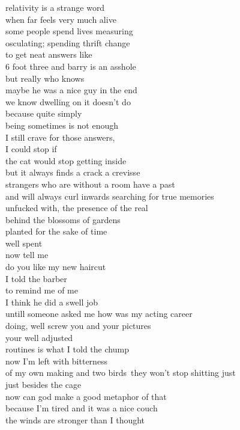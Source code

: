 relativity is a strange word\\
when far feels very much alive\\
some people spend lives measuring\\
osculating; spending thrift change\\
to get neat answers like\\
6 foot three and barry is an asshole\\
but really who knows\\
maybe he was a nice guy in the end\\
we know dwelling on it doesn't do\\

because quite simply\\
being sometimes is not enough\\
I still crave for those answers, \\
I could stop if\\
the cat would stop getting inside\\
but it always finds a crack a crevisse\\
strangers who are without a room have a past\\
and will always curl inwards searching for true memories\\
unfucked with, the presence of the real\\
behind the blossoms of gardens\\
planted for the sake of time\\
well spent\\

now tell me\\
do you like my new haircut\\
I told the barber\\
to remind me of me\\
I think he did a swell job\\
untill someone asked me how was my acting career\\
doing, well screw you and your pictures\\
your  well adjusted\\
routines is what I told the chump\\
now I'm left with bitterness\\
of my own making and two birds\
they won't stop shitting just\\
just besides the cage\\
now can god make a good metaphor of that\\
because I'm tired and it was a nice couch\\
the winds are stronger than I thought
